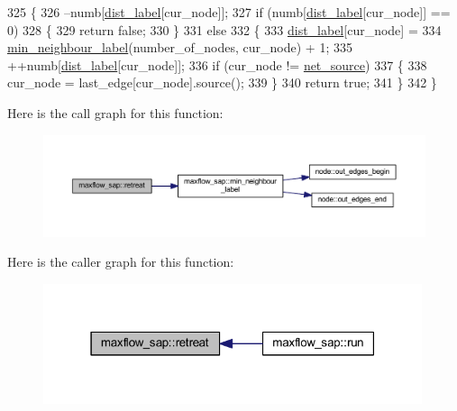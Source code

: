 \begin{DoxyCode}
325 \{
326     --numb[\mbox{\hyperlink{classmaxflow__sap_a14eef09823ae0ac69348c2b3a60e6ca3}{dist\_label}}[cur\_node]];
327     \textcolor{keywordflow}{if} (numb[\mbox{\hyperlink{classmaxflow__sap_a14eef09823ae0ac69348c2b3a60e6ca3}{dist\_label}}[cur\_node]] == 0)
328     \{
329         \textcolor{keywordflow}{return} \textcolor{keyword}{false};
330     \}
331     \textcolor{keywordflow}{else}
332     \{
333         \mbox{\hyperlink{classmaxflow__sap_a14eef09823ae0ac69348c2b3a60e6ca3}{dist\_label}}[cur\_node] =
334             \mbox{\hyperlink{classmaxflow__sap_a7cf86463129a569f41883fdad6869fce}{min\_neighbour\_label}}(number\_of\_nodes, cur\_node) + 1;
335         ++numb[\mbox{\hyperlink{classmaxflow__sap_a14eef09823ae0ac69348c2b3a60e6ca3}{dist\_label}}[cur\_node]];
336         \textcolor{keywordflow}{if} (cur\_node != \mbox{\hyperlink{classmaxflow__sap_abd4266c76dbd73f7f719d3a4fba2655d}{net\_source}})
337         \{
338             cur\_node = last\_edge[cur\_node].source();
339         \}
340         \textcolor{keywordflow}{return} \textcolor{keyword}{true};
341     \}
342 \}
\end{DoxyCode}
Here is the call graph for this function\+:\nopagebreak
\begin{figure}[H]
\begin{center}
\leavevmode
\includegraphics[width=350pt]{classmaxflow__sap_a88a24204f44031d2332493474ee18f95_cgraph}
\end{center}
\end{figure}
Here is the caller graph for this function\+:\nopagebreak
\begin{figure}[H]
\begin{center}
\leavevmode
\includegraphics[width=315pt]{classmaxflow__sap_a88a24204f44031d2332493474ee18f95_icgraph}
\end{center}
\end{figure}
\mbox{\label{classmaxflow__sap_ab4305a2bb370ad9c43cc68d339b2dda0}} 
